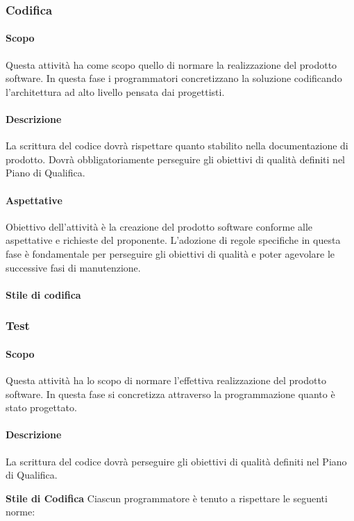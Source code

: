 \subsubsection{Codifica}
\paragraph{Scopo}
Questa attività ha come scopo quello di normare la realizzazione del prodotto software.  In questa fase i programmatori concretizzano la soluzione codificando l'architettura ad alto livello pensata dai progettisti.
\paragraph{Descrizione}
La scrittura del codice dovrà rispettare quanto stabilito nella documentazione di prodotto. Dovrà obbligatoriamente perseguire gli obiettivi di qualità definiti nel Piano di Qualifica.
\paragraph{Aspettative}
Obiettivo dell'attività è la creazione del prodotto software conforme alle aspettative e richieste del proponente.  L'adozione di regole specifiche in questa fase è fondamentale per perseguire gli obiettivi di qualità e poter agevolare le successive fasi di manutenzione.

\paragraph{Stile di codifica}

\subsubsection{Test}
\paragraph{Scopo}
Questa attività ha lo scopo di normare l'effettiva realizzazione del prodotto software.  In questa fase si concretizza attraverso la programmazione quanto è stato progettato.
\paragraph{Descrizione}
La scrittura del codice dovrà perseguire gli obiettivi di qualità definiti nel Piano di Qualifica.

\textbf{Stile di Codifica}
Ciascun programmatore è tenuto a rispettare le seguenti norme:

